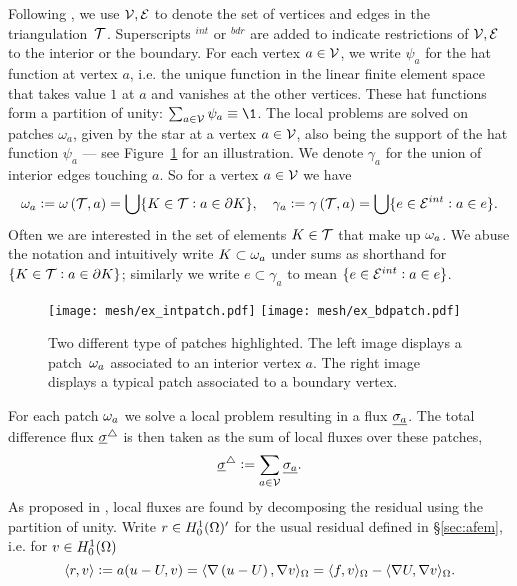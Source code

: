 \documentclass[thesis.tex]{subfiles}
\begin{document}
Following \cite{ernequil}, we use $\mathcal{V}, \mathcal{E}$ to denote  the set of vertices and edges in the triangulation~$\mathcal{T}$. 
Superscripts  $^{int}$ or $^{bdr}$ are added to indicate restrictions of $\mathcal{V}, \mathcal{E}$ to the interior or the boundary.
For each vertex $a \in \mathcal{V}$, we write $\psi_a$ for the hat function at vertex $a$, 
i.e. the unique function in the linear finite element space
that takes value $1$ at $a$ and vanishes at the other vertices.
These hat functions form a partition of unity: $\sum_{a \in \V} \psi_a \equiv \1$.
The local problems are solved on patches $\omega_a$, given by the star at a vertex $a \in \mathcal{V}$, also being the support of
the hat function $\psi_a$ --- see Figure~\ref{fig:patches} for an illustration. We denote $\gamma_a$ for the union of interior edges touching $a$. 
So for a vertex $a \in \mathcal{V}$ we have
\[
  \omega_a       := \omega\left(\mathcal{T}, a\right) = \bigcup \{ K \in \mathcal{T} : a \in \partial K\},
  \quad \gamma_a := \gamma\left(\mathcal{T}, a\right) = \bigcup \{ e \in \mathcal{E}^{int} : a \in e\}.
\]
Often we are interested in the set of elements $K \in \mathcal{T}$ that make up $\omega_a$. We abuse the notation and intuitively write $K \subset \omega_a$
under sums as shorthand for $\set{K \in \mathcal{T}: a \in \partial K}$; similarly we write $e \subset \gamma_a$ to mean $\{e \in \mathcal{E}^{int} : a\in e\}$.
 
\begin{figure}
  \centering
  \texttt{[image: mesh/ex\_intpatch.pdf]}
  \quad
  \texttt{[image: mesh/ex\_bdpatch.pdf]}
  \caption{Two different type of patches highlighted. The left image displays a patch~$\omega_a$  associated to an interior vertex $a$.
  The right image displays a typical patch associated to a boundary vertex.}
  \label{fig:patches}
\end{figure}
  
For each patch $\omega_a$ we solve a local problem resulting in a  flux $\underline{\sigma_a}$. 
The total difference flux $\underline{\sigma}^\triangle$ is then taken as the sum of local fluxes over these patches, 
\[
  \underline{\sigma}^\triangle := \sum_{a \in \mathcal{V}} \underline{\sigma_a}.
\] 
As proposed  in \cite{braessequilrobust}, local fluxes are found by decomposing the residual using the partition of unity. 
Write $r \in H_0^1(\Omega)'$ for the usual residual defined in \S\ref{sec:afem}, i.e. for $v\in H_0^1(\Omega)$ 
\[
  \langle r,v \rangle := a(u - U, v) = \langle \nabla \left(u - U\right), \nabla v \rangle_\Omega = \langle f,v \rangle_\Omega - \langle \nabla U,\nabla v \rangle_\Omega.
\]
\end{document}
